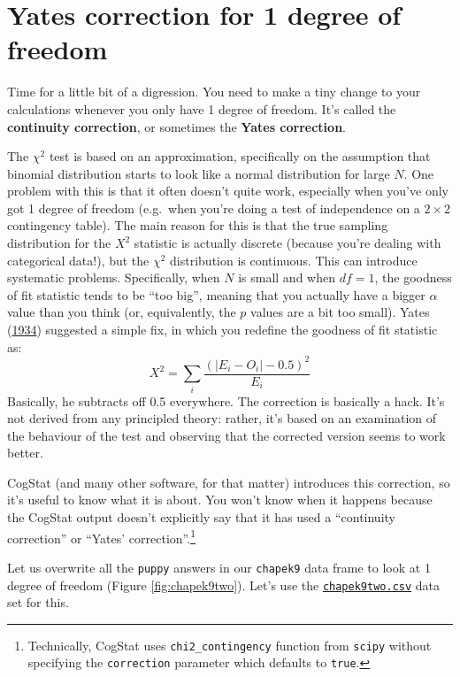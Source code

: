\documentclass[
]{book}
\theoremstyle{definition}
\theoremstyle{definition}
\theoremstyle{definition}
\theoremstyle{definition}
\theoremstyle{remark}
\begin{document}
\hypertarget{yates}{%
\section{Yates correction for 1 degree of freedom}\label{yates}}

Time for a little bit of a digression. You need to make a tiny change to your calculations whenever you only have 1 degree of freedom. It's called the \textbf{continuity correction}, or sometimes the \textbf{Yates correction}.

The \(\chi^2\) test is based on an approximation, specifically on the assumption that binomial distribution starts to look like a normal distribution for large \(N\). One problem with this is that it often doesn't quite work, especially when you've only got 1 degree of freedom (e.g.~when you're doing a test of independence on a \(2 \times 2\) contingency table). The main reason for this is that the true sampling distribution for the \(X^2\) statistic is actually discrete (because you're dealing with categorical data!), but the \(\chi^2\) distribution is continuous. This can introduce systematic problems. Specifically, when \(N\) is small and when \(df=1\), the goodness of fit statistic tends to be ``too big'', meaning that you actually have a bigger \(\alpha\) value than you think (or, equivalently, the \(p\) values are a bit too small). Yates (\protect\hyperlink{ref-Yates1934}{1934}) suggested a simple fix, in which you redefine the goodness of fit statistic as:
\[
X^2 = \sum_{i} \frac{(|E_i - O_i| - 0.5)^2}{E_i}
\]
Basically, he subtracts off 0.5 everywhere. The correction is basically a hack. It's not derived from any principled theory: rather, it's based on an examination of the behaviour of the test and observing that the corrected version seems to work better.

CogStat (and many other software, for that matter) introduces this correction, so it's useful to know what it is about. You won't know when it happens because the CogStat output doesn't explicitly say that it has used a ``continuity correction'' or ``Yates' correction''.\footnote{Technically, CogStat uses \texttt{chi2\_contingency} function from \texttt{scipy} without specifying the \texttt{correction} parameter which defaults to \texttt{true}.}

Let us overwrite all the \texttt{puppy} answers in our \texttt{chapek9} data frame to look at 1 degree of freedom (Figure \ref{fig:chapek9two}). Let's use the \href{resources/data/chapek9two.csv}{\texttt{chapek9two.csv}} data set for this.
\end{document}
